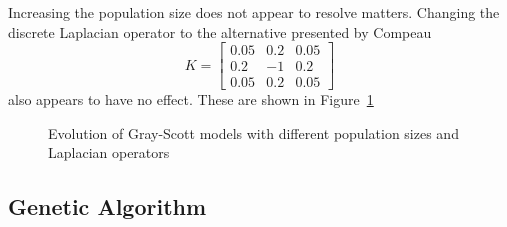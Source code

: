 Increasing the population size does not appear to resolve matters. Changing the discrete Laplacian operator to the alternative presented by Compeau\cite{compeau}
\[
  K= \begin{bmatrix}
    0.05 & 0.2 & 0.05\\
    0.2 & -1 & 0.2\\
    0.05 & 0.2 & 0.05
  \end{bmatrix}
\]
also appears to have no effect. These are shown in Figure~\ref{fig:more-fails}

\begin{figure}[!h]
\centering
            \hfill
            \hfill
            \caption{Evolution of Gray-Scott models with different population sizes and Laplacian operators}
\label{fig:more-fails}
\end{figure}

\subsection{Genetic Algorithm}




